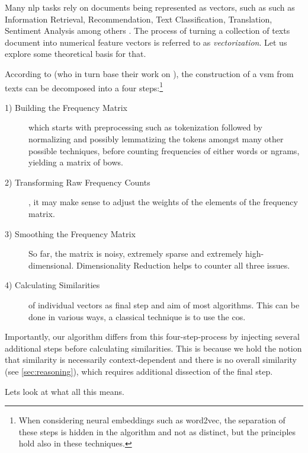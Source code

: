 Many \gls{nlp} tasks rely on documents being represented as vectors, such as such as Information Retrieval, Recommendation, Text Classification, Translation, Sentiment Analysis among others \cite{Smith2017,bird2009natural,Devlin2019,Le2014,Mikolov2013a,Turney2010,Guo,Chen2018,Maas2011}. The process of turning a collection of texts document into numerical feature vectors is referred to as \textit{vectorization}. Let us explore some theoretical basis for that.

According to \textcite{Turney2010} (who in turn base their work on \textcite{Lowe}), the construction of a \gls{vsm} from texts can be decomposed into a four steps:\footnote{When considering neural embeddings such as \gls{word2vec}, the separation of these steps is hidden in the algorithm and not as distinct, but the principles hold also in these techniques.}

\begin{description}
    \item[1) Building the Frequency Matrix] which starts with preprocessing such as tokenization followed by normalizing and possibly \gls{lemma}tizing the tokens amongst many other possible techniques, before counting frequencies of either words or \glspl{ngram}, yielding a matrix of \glspl{bow}.
    \item[2) Transforming Raw Frequency Counts]  \cite{Turney2010}, it may make sense to adjust the weights of the elements of the frequency matrix.
    \item[3) Smoothing the Frequency Matrix] So far, the matrix is noisy, extremely sparse and extremely high-dimensional. Dimensionality Reduction helps to counter all three issues.
    \item[4) Calculating Similarities] of individual vectors as final step and aim of most algorithms. This can be done in various ways, a classical technique is to use the \gls{cos}.
\end{description}

Importantly, our algorithm differs from this four-step-process by injecting several additional steps before calculating similarities. This is because we hold the notion that similarity is necessarily context-dependent and there is no overall similarity (see \autoref{sec:reasoning}), which requires additional dissection of the final step.

Lets look at what all this means.



